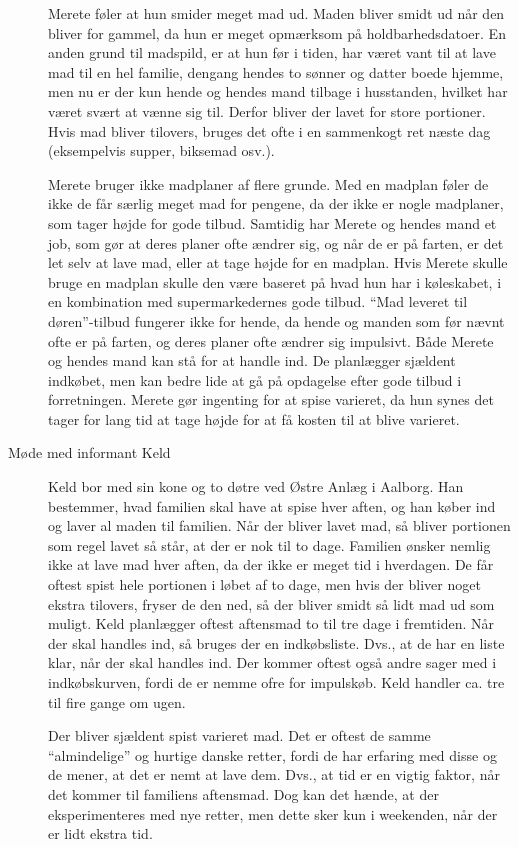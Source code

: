 \begin{description}
Merete føler at hun smider meget mad ud. Maden bliver smidt ud når den bliver for gammel, da hun er meget opmærksom på holdbarhedsdatoer. En anden grund til madspild, er at hun før i tiden, har været vant til at lave mad til en hel familie, dengang hendes to sønner og datter boede hjemme, men nu er der kun hende og hendes mand tilbage i husstanden, hvilket har været svært at vænne sig til. Derfor bliver der lavet for store portioner. Hvis mad bliver tilovers, bruges det ofte i en sammenkogt ret næste dag (eksempelvis supper, biksemad osv.).

Merete bruger ikke madplaner af flere grunde. Med en madplan føler de ikke de får særlig meget mad for pengene, da der ikke er nogle madplaner, som tager højde for gode tilbud. Samtidig har Merete og hendes mand et job, som gør at deres planer ofte ændrer sig, og når de er på farten, er det let selv at lave mad, eller at tage højde for en madplan. Hvis Merete skulle bruge en madplan skulle den være baseret på hvad hun har i køleskabet, i en kombination med supermarkedernes gode tilbud. ``Mad leveret til døren''-tilbud fungerer ikke for hende, da hende og manden som før nævnt ofte er på farten, og deres planer ofte ændrer sig impulsivt. Både Merete og hendes mand kan stå for at handle ind. De planlægger sjældent indkøbet, men kan bedre lide at gå på opdagelse efter gode tilbud i forretningen. Merete gør ingenting for at spise varieret, da hun synes det tager for lang tid at tage højde for at få kosten til at blive varieret.

\item[Møde med informant Keld]

Keld bor med sin kone og to døtre ved Østre Anlæg i Aalborg. Han bestemmer, hvad familien skal have at spise hver aften, og han køber ind og laver al maden til familien. Når der bliver lavet mad, så bliver portionen som regel lavet så står, at der er nok til to dage. Familien ønsker nemlig ikke at lave mad hver aften, da der ikke er meget tid i hverdagen. De får oftest spist hele portionen i løbet af to dage, men hvis der bliver noget ekstra tilovers, fryser de den ned, så der bliver smidt så lidt mad ud som muligt. Keld planlægger oftest aftensmad to til tre dage i fremtiden. Når der skal handles ind, så bruges der en indkøbsliste. Dvs., at de har en liste klar, når der skal handles ind. Der kommer oftest også andre sager med i indkøbskurven, fordi de er nemme ofre for impulskøb. Keld handler ca. tre til fire gange om ugen.

Der bliver sjældent spist varieret mad. Det er oftest de samme ``almindelige'' og hurtige danske retter, fordi de har erfaring med disse og de mener, at det er nemt at lave dem. Dvs., at tid er en vigtig faktor, når det kommer til familiens aftensmad. Dog kan det hænde, at der eksperimenteres med nye retter, men dette sker kun i weekenden, når der er lidt ekstra tid.


\end{description}
